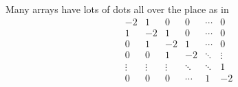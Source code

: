 \documentclass[11pt, titlepage]{article}
\begin{document}
				Many arrays have lots of dots all over the place as in
				\[
					\begin{matrix}
						-2 & 1 & 0 & 0 & \cdots & 0  \\
						1 & -2 & 1 & 0 & \cdots & 0  \\
						0 & 1 & -2 & 1 & \cdots & 0  \\
						0 & 0 & 1 & -2 & \ddots & \vdots \\
						\vdots & \vdots & \vdots & \ddots & \ddots & 1  \\
						0 & 0 & 0 & \cdots & 1 & -2
					\end{matrix}
				\]
\end{document}
